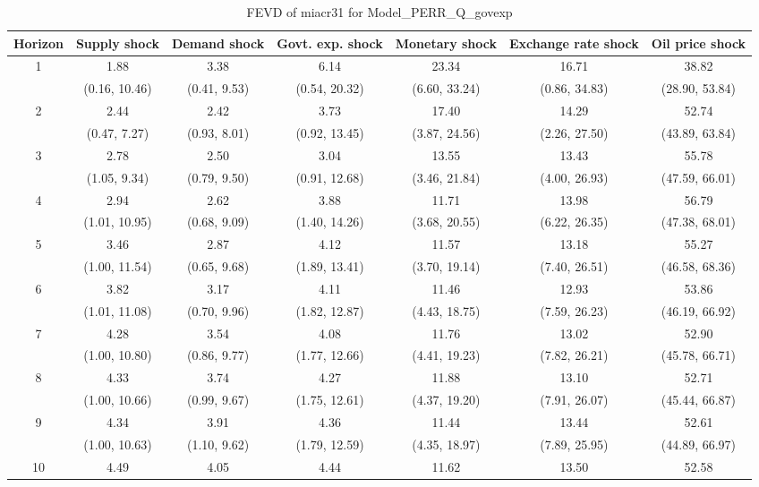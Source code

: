 \documentclass{article}
\begin{document}
\begin{table}
	\footnotesize
	\caption{FEVD of miacr31 for Model_PERR_Q_govexp}
	\begin{tabular}{ccccccc}
		Horizon & Supply shock & Demand shock & Govt. exp. shock & Monetary shock & Exchange rate shock & Oil price shock\\ \hline
		\multirow{2}{*}{1} & 1.88 & 3.38 & 6.14 & 23.34 & 16.71 & 38.82\\
		 & (0.16, 10.46) & (0.41, 9.53) & (0.54, 20.32) & (6.60, 33.24) & (0.86, 34.83) & (28.90, 53.84)\\
		\multirow{2}{*}{2} & 2.44 & 2.42 & 3.73 & 17.40 & 14.29 & 52.74\\
		 & (0.47, 7.27) & (0.93, 8.01) & (0.92, 13.45) & (3.87, 24.56) & (2.26, 27.50) & (43.89, 63.84)\\
		\multirow{2}{*}{3} & 2.78 & 2.50 & 3.04 & 13.55 & 13.43 & 55.78\\
		 & (1.05, 9.34) & (0.79, 9.50) & (0.91, 12.68) & (3.46, 21.84) & (4.00, 26.93) & (47.59, 66.01)\\
		\multirow{2}{*}{4} & 2.94 & 2.62 & 3.88 & 11.71 & 13.98 & 56.79\\
		 & (1.01, 10.95) & (0.68, 9.09) & (1.40, 14.26) & (3.68, 20.55) & (6.22, 26.35) & (47.38, 68.01)\\
		\multirow{2}{*}{5} & 3.46 & 2.87 & 4.12 & 11.57 & 13.18 & 55.27\\
		 & (1.00, 11.54) & (0.65, 9.68) & (1.89, 13.41) & (3.70, 19.14) & (7.40, 26.51) & (46.58, 68.36)\\
		\multirow{2}{*}{6} & 3.82 & 3.17 & 4.11 & 11.46 & 12.93 & 53.86\\
		 & (1.01, 11.08) & (0.70, 9.96) & (1.82, 12.87) & (4.43, 18.75) & (7.59, 26.23) & (46.19, 66.92)\\
		\multirow{2}{*}{7} & 4.28 & 3.54 & 4.08 & 11.76 & 13.02 & 52.90\\
		 & (1.00, 10.80) & (0.86, 9.77) & (1.77, 12.66) & (4.41, 19.23) & (7.82, 26.21) & (45.78, 66.71)\\
		\multirow{2}{*}{8} & 4.33 & 3.74 & 4.27 & 11.88 & 13.10 & 52.71\\
		 & (1.00, 10.66) & (0.99, 9.67) & (1.75, 12.61) & (4.37, 19.20) & (7.91, 26.07) & (45.44, 66.87)\\
		\multirow{2}{*}{9} & 4.34 & 3.91 & 4.36 & 11.44 & 13.44 & 52.61\\
		 & (1.00, 10.63) & (1.10, 9.62) & (1.79, 12.59) & (4.35, 18.97) & (7.89, 25.95) & (44.89, 66.97)\\
		\multirow{2}{*}{10} & 4.49 & 4.05 & 4.44 & 11.62 & 13.50 & 52.58\\

\end{tabular}
\end{table}
\end{document}
